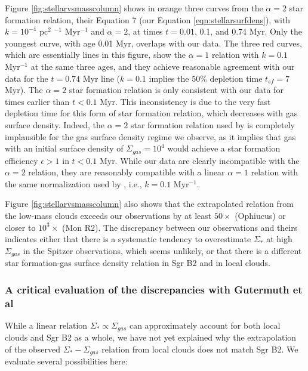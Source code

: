 \documentclass[twocolumn]{aastex61}
\begin{document}
Figure \ref{fig:stellarvsmasscolumn}  shows in orange three curves from the
\citet{Gutermuth2011a} $\alpha=2$ star formation relation, their Equation 7
(our Equation \ref{eqn:stellarsurfdens}),
with $k=10^{-4}$ pc$^{2}$ \msun$^{-1}$ Myr$^{-1}$ and $\alpha=2$, at times
$t=0.01$, 0.1, and 0.74 Myr.  Only the youngest curve, with age 0.01 Myr,
overlaps with our data.  The three red curves, which are essentially lines in
this figure, show the $\alpha=1$ relation with $k=0.1$ Myr$^{-1}$ at the same
three ages, and they achieve reasonable agreement with our data for the $t=0.74$
Myr line ($k=0.1$ \permyr implies the 50\% depletion time $t_{sf}=7$ Myr).  The
$\alpha=2$ star formation relation  is only consistent with our
data for times earlier than $t<0.1$ Myr.  This inconsistency is due to the very
fast depletion time for this form of star formation relation, which decreases
with gas surface density.  Indeed, the $\alpha=2$ star formation relation used
by \citet{Gutermuth2011a} is completely implausible for the gas surface density
regime we observe, as it implies that gas with an initial surface density of
$\Sigma_{gas}=10^4$ \msun \perspc would achieve a star formation efficiency
$\epsilon>1$ in $t<0.1$ Myr.  While our data are clearly incompatible with the
$\alpha=2$ relation, they are reasonably compatible with a linear $\alpha=1$
relation with the same normalization used by \citet{Gutermuth2011a}, i.e.,
$k=0.1$ Myr$^{-1}$.



Figure \ref{fig:stellarvsmasscolumn} also shows that the extrapolated relation
from the low-mass clouds exceeds our observations by at least $50\times$
(Ophiucus) or closer to $10^3\times$ (Mon R2).   The discrepancy between our
observations and theirs indicates either that there is a systematic tendency to
overestimate $\Sigma_*$ at high $\Sigma_{gas}$ in the Spitzer observations,
which seems unlikely, or that there is a different star formation-gas surface
density relation in Sgr B2 and in local clouds.


\subsubsection{A critical evaluation of the discrepancies with Gutermuth et al}
\label{sec:gutermuthdiscrepancy}
While a linear relation $\Sigma_* \propto \Sigma_{gas}$ can approximately
account for both local clouds and Sgr B2 as a whole, we have not yet explained
why the extrapolation of the observed $\Sigma_* - \Sigma_{gas}$ relation from
local clouds does not match Sgr B2.  We evaluate several possibilities here:
\end{document}
